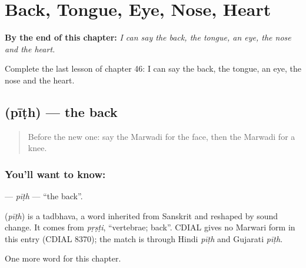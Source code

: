 
\chapter{Back, Tongue, Eye, Nose, Heart}
\label{ch:mw-back-tongue-eye-nose-heart}

\begin{chapteropening}
\textbf{By the end of this chapter:} \emph{I can say the back, the tongue, an eye, the nose and the heart.}

Complete the last lesson of chapter 46: I can say the back, the tongue, an eye, the nose and the heart.
\end{chapteropening}

\section[\texorpdfstring{\mw{पीठ} (pīṭh)}{पीठ (pīṭh)}]{ (pīṭh) — the back}

\label{lesson:MW-C46-pith}



\begin{quote}
Before the new one: say the Marwadi for the face, then the Marwadi for a knee.
\end{quote}

\subsection*{You'll want to know: }
\textbf{} — \emph{pīṭh} — \textquotedblleft{}the back\textquotedblright{}.

\begin{cousinweb}
\textbf{} (\emph{pīṭh}) is a tadbhava, a word inherited from Sanskrit and reshaped by sound change. It comes from \emph{pṛṣṭi}, \textquotedblleft{}vertebrae; back\textquotedblright{}. CDIAL gives no Marwari form in this entry (CDIAL 8370); the match is through Hindi \emph{pīṭh} and Gujarati \emph{pīṭh}.
\end{cousinweb}

\begin{grammarlens}[title={What you've built}]
One more word for this chapter.
\end{grammarlens}


